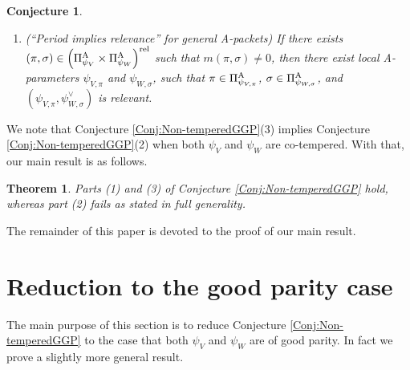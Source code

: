 \documentclass[11pt,letterpaper]{amsart}
\theoremstyle{plain}
\newcounter{theorem}[section]
\numberwithin{theorem}{section}
\numberwithin{equation}{subsection}
\newtheorem{Thm}[theorem]{Theorem}
\newtheorem{Conj}[theorem]{Conjecture}
\theoremstyle{remark}
\def\AP{\Pi^{\rm A}} %
\def\rel{{\rm rel}} %
\begin{document}
\begin{Conj}
\begin{enumerate}
        \vskip 5pt

        \item (``Period implies relevance'' for general A-packets) If there exists $\left(\pi,\sigma\right)\in\left(\AP_{{\psi_V}}\times \AP_{{\psi_W}}\right)^\rel$ such that $m\left(\pi,\sigma\right)\neq 0$, then there exist local A-parameters $\psi_{V,\pi}$ and $\psi_{W,\sigma}$, such that $\pi\in\AP_{\psi_{V,\pi}}$, $\sigma\in\AP_{\psi_{W,\sigma}}$, and $\left(\psi_{V,\pi},\psi_{W,\sigma}^\vee\right)$ is relevant.
      \end{enumerate}   
\end{Conj}

\vskip 5pt

We note that Conjecture \ref{Conj:Non-temperedGGP}(3) implies Conjecture \ref{Conj:Non-temperedGGP}(2) when both \(\psi_V\) and \(\psi_W\) are co-tempered. With that, our main result is as follows.

\begin{Thm}\label{T:mainresult}
Parts (1) and (3) of Conjecture \ref{Conj:Non-temperedGGP} hold, whereas part (2) fails as stated in full generality.    
\end{Thm}

\vskip 5pt

The remainder of this paper is devoted to the proof of our main result.


\vskip 10pt

\section{Reduction to the good parity case} %
\label{sec:reduction_to_the_good_parity_case}

The main purpose of this section is to reduce Conjecture \ref{Conj:Non-temperedGGP} to the case that both $\psi_V$ and $\psi_W$ are of good parity. In fact we prove a slightly more general result. 
\end{document}
